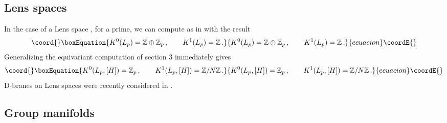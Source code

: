 \documentclass[a4paper,reqno]{amsart}
\theoremstyle{plain}
\theoremstyle{definition}
\theoremstyle{remark}
\numberwithin{equation}{section}
\numberwithin{figure}{section}
\providecommand{\ZZ}{{\mathbb Z}}
\providecommand{\<}{\langle}
\renewcommand{\>}{\rangle}
\begin{document}
\subsection{Lens spaces}

In the case of a Lens space \myHighlight{$L_p=S^3/\ZZ_p$}\coordHE{}, for \coordHE{} a prime, we can
compute \coordHE{} as in \cite{Ati} with the result
\begin{equation}\coord{}\boxEquation{
K^0(L_p) = \ZZ\oplus \ZZ_p\,,\qquad K^1(L_p)= \ZZ \,.
}{
K^0(L_p) = \ZZ\oplus \ZZ_p\,,\qquad K^1(L_p)= \ZZ \,.
}{ecuacion}\coordE{}\end{equation}
Generalizing the equivariant computation of section 3 immediately gives
\begin{equation}\coord{}\boxEquation{
K^0(L_p,[H]) = \ZZ_p\,,\qquad K^1(L_p,[H])= \ZZ/N\ZZ \,.
}{
K^0(L_p,[H]) = \ZZ_p\,,\qquad K^1(L_p,[H])= \ZZ/N\ZZ \,.
}{ecuacion}\coordE{}\end{equation}
D-branes on Lens spaces were recently considered in \cite{MMS}.

\subsection{Group manifolds}
\end{document}
